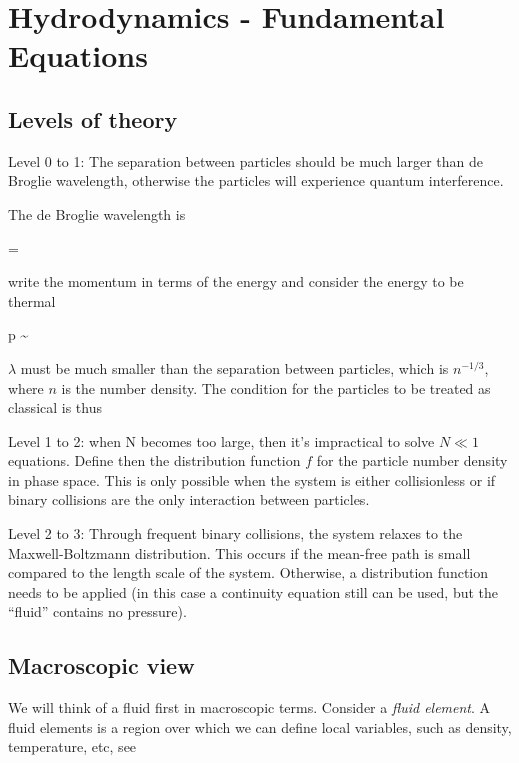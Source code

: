 

\chapter{Hydrodynamics - Fundamental Equations}

\section{Levels of theory}

Level 0 to 1:  The separation between particles should be much larger
than de Broglie wavelength, otherwise the particles will experience
quantum interference. 

The de Broglie wavelength is 

\beq
\lambda = 
\eeq

\noindent write the momentum in terms of the energy and consider the energy to
be thermal

\beq
p  \sim {}
\eeq

\noindent $\lambda$ must be much smaller than the separation between particles,
which is $n^{-1/3}$, where $n$ is the number density. The condition
for the particles to be treated as classical is thus 

\beq
{} 
\eeq


Level 1 to 2: when N becomes too large, then it's impractical to solve
$N\ll 1$ equations. Define then the distribution function $f$ for the
particle number density in phase space. This is only possible when the
system is either collisionless or if binary collisions are the only
interaction between particles.

Level 2 to 3: Through frequent binary collisions, the system relaxes
to the Maxwell-Boltzmann distribution. This occurs if the mean-free
path is small compared to the length scale of the system. Otherwise, a
distribution function needs to be applied (in this case a continuity
equation still can be used, but the ``fluid'' contains no pressure). 


\section{Macroscopic view}

We will think of a fluid first in macroscopic terms. Consider a 
{\it fluid element}. A fluid elements is a region over which we can
define local variables, such as density, temperature, etc, see 

